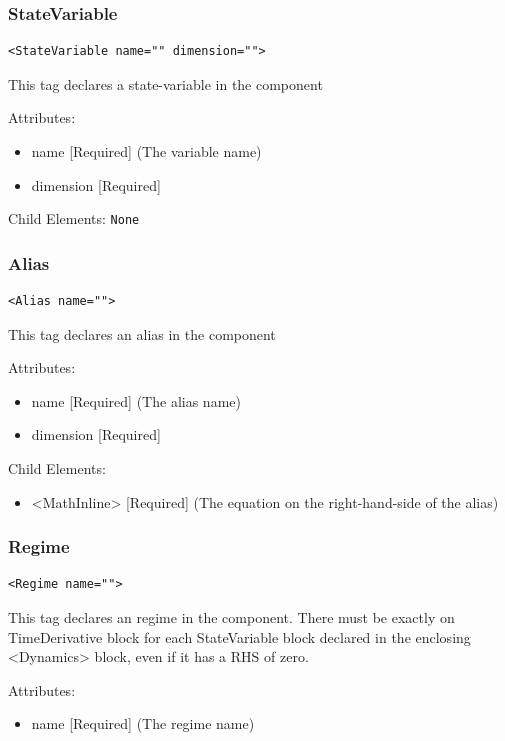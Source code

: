 \documentclass{article}
\begin{document}
\subsubsection{StateVariable}
%
\begin{lstlisting}
<StateVariable name="" dimension="">
\end{lstlisting}

This tag declares a state-variable in the component

Attributes:
%
\begin{itemize}
\item name {[}Required{]} (The variable name)
\item dimension {[}Required{]}
\end{itemize}

Child Elements: \texttt{None}

\subsubsection{Alias}
%
\begin{lstlisting}
<Alias name="">
\end{lstlisting}

This tag declares an alias in the component

Attributes:
%
\begin{itemize}
\item name {[}Required{]} (The alias name)
\item dimension {[}Required{]}
\end{itemize}

Child Elements:
%
\begin{itemize}
\item <MathInline> {[}Required{]} (The equation on the right-hand-side of the alias)
\end{itemize}

\subsubsection{Regime}
%
\begin{lstlisting}
<Regime name="">
\end{lstlisting}

This tag declares an regime in the component. There must be exactly on
TimeDerivative block for each StateVariable block declared in the enclosing
<Dynamics> block, even if it has a RHS of zero.

Attributes:
%
\begin{itemize}
\item name {[}Required{]} (The regime name)
\end{itemize}
\end{document}

